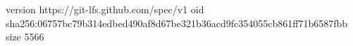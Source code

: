 version https://git-lfs.github.com/spec/v1
oid sha256:06757bc79b314edbed490af8d67be321b36acd9fc354055cb861ff71b6587fbb
size 5566
